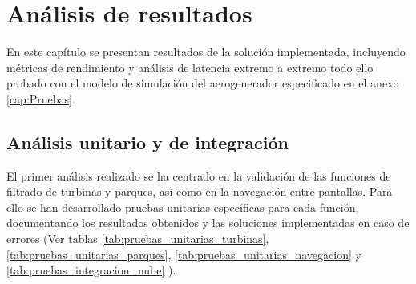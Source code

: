 \chapter{Análisis de resultados}
\label{cap:analisis_de_resultados}

\titlespacing{\section}{0em}{.75em}{.2em}
\titlespacing{\subsection}{0em}{.5em}{0em}

En este capítulo se presentan resultados de la solución implementada, incluyendo métricas de rendimiento y análisis de latencia extremo a extremo todo ello probado con el modelo de simulación del aerogenerador especificado en el anexo \ref{cap:Pruebas}.

\section{Análisis unitario y de integración}
\label{subsec:analisis_unitario_integracion}

El primer análisis realizado se ha centrado en la validación de las funciones de filtrado de turbinas y parques, así como en la navegación entre pantallas. Para ello se han desarrollado pruebas unitarias específicas para cada función, documentando los resultados obtenidos y las soluciones implementadas en caso de errores (Ver tablas \ref{tab:pruebas_unitarias_turbinas}, \ref{tab:pruebas_unitarias_parques}, \ref{tab:pruebas_unitarias_navegacion} y \ref{tab:pruebas_integracion_nube} ).\vspace{0.5cm}

